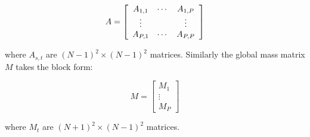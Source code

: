 \begin{equation}
    A = \left[\begin{array}{c c c}
        A_{1,1} & \cdots & A_{1,P} \\
        \vdots & & \vdots \\
        A_{P,1} & \cdots & A_{P,P}
    \end{array}\right]
\end{equation}

where $A_{s,t}$ are $(N-1)^2 \times (N-1)^2$ matrices. Similarly the global
mass matrix $M$ takes the block form:

\begin{equation}
    M = \left[\begin{array}{c}
            M_1 \\ \vdots \\ M_P
    \end{array}\right]
\end{equation}

where $M_t$ are $(N+1)^2 \times (N-1)^2$ matrices.
